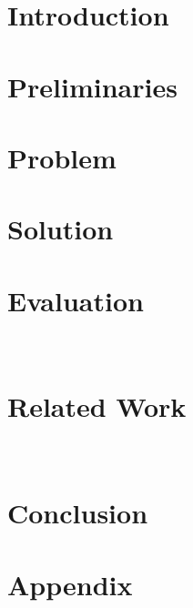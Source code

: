 \section{Introduction}

%
\section{Preliminaries}

%
\section{Problem}

%
\section{Solution}

%
\section{Evaluation}~\label{sec:eval}

%
\vspace{-3em}
\section{Related Work}~\label{sec:related}


\section{Conclusion}










\newpage
\section{Appendix}




